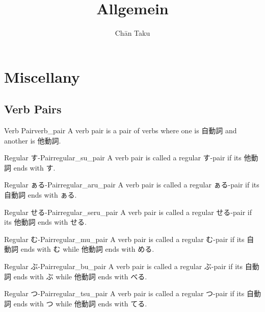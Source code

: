 \documentclass{article}
\title{Allgemein}
\author{Ch\=an Taku}
\begin{document}
\maketitle

\section{Miscellany}

\subsection{Verb Pairs}

\begin{definition}{Verb Pair}{verb_pair}
    A verb pair is a pair of verbs where one is 自動詞 and another is 他動詞.
\end{definition}

\begin{definition}{Regular す-Pair}{regular_su_pair}
    A verb pair is called a regular す-pair if its 他動詞 ends with す.
\end{definition}

\begin{definition}{Regular ぁる-Pair}{regular_aru_pair}
    A verb pair is called a regular ぁる-pair if its 自動詞 ends with ぁる.
\end{definition}

\begin{definition}{Regular せる-Pair}{regular_seru_pair}
    A verb pair is called a regular せる-pair if its 他動詞 ends with せる.
\end{definition}

\begin{definition}{Regular む-Pair}{regular_mu_pair}
    A verb pair is called a regular む-pair if its 自動詞 ends with む while 他動詞 ends with める.
\end{definition}

\begin{definition}{Regular ぶ-Pair}{regular_bu_pair}
    A verb pair is called a regular ぶ-pair if its 自動詞 ends with ぶ while 他動詞 ends with べる.
\end{definition}

\begin{definition}{Regular つ-Pair}{regular_tsu_pair}
    A verb pair is called a regular つ-pair if its 自動詞 ends with つ while 他動詞 ends with てる.
\end{definition}

% 
% 
\end{document}
